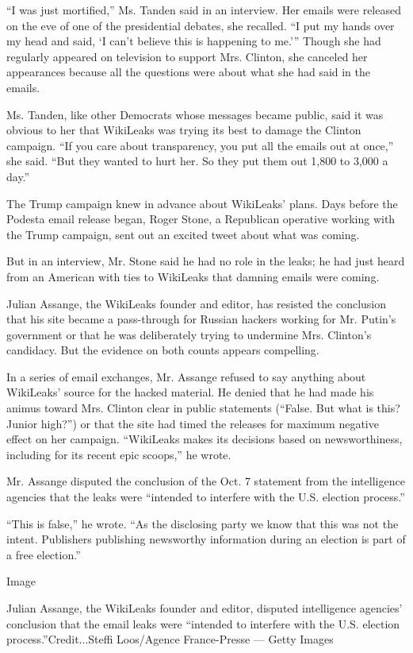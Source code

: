 ``I was just mortified,'' Ms. Tanden said in an interview. Her emails
were released on the eve of one of the presidential debates, she
recalled. ``I put my hands over my head and said, `I can't believe this
is happening to me.''' Though she had regularly appeared on television
to support Mrs. Clinton, she canceled her appearances because all the
questions were about what she had said in the emails.

Ms. Tanden, like other Democrats whose messages became public, said it
was obvious to her that WikiLeaks was trying its best to damage the
Clinton campaign. ``If you care about transparency, you put all the
emails out at once,'' she said. ``But they wanted to hurt her. So they
put them out 1,800 to 3,000 a day.''

The Trump campaign knew in advance about WikiLeaks' plans. Days before
the Podesta email release began, Roger Stone, a Republican operative
working with the Trump campaign, sent out an excited tweet about what
was coming.

But in an interview, Mr. Stone said he had no role in the leaks; he had
just heard from an American with ties to WikiLeaks that damning emails
were coming.

Julian Assange, the WikiLeaks founder and editor, has resisted the
conclusion that his site became a pass-through for Russian hackers
working for Mr. Putin's government or that he was deliberately trying to
undermine Mrs. Clinton's candidacy. But the evidence on both counts
appears compelling.

In a series of email exchanges, Mr. Assange refused to say anything
about WikiLeaks' source for the hacked material. He denied that he had
made his animus toward Mrs. Clinton clear in public statements (``False.
But what is this? Junior high?'') or that the site had timed the
releases for maximum negative effect on her campaign. ``WikiLeaks makes
its decisions based on newsworthiness, including for its recent epic
scoops,'' he wrote.

Mr. Assange disputed the conclusion of the Oct. 7 statement from the
intelligence agencies that the leaks were ``intended to interfere with
the U.S. election process.''

``This is false,'' he wrote. ``As the disclosing party we know that this
was not the intent. Publishers publishing newsworthy information during
an election is part of a free election.''

Image

Julian Assange, the WikiLeaks founder and editor, disputed intelligence
agencies' conclusion that the email leaks were ``intended to interfere
with the U.S. election process.''Credit...Steffi Loos/Agence
France-Presse --- Getty Images

